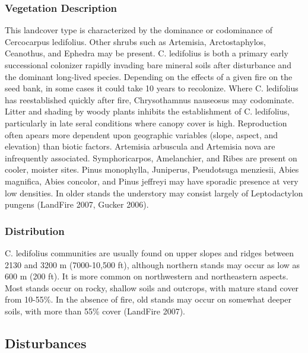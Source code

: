 \subsubsection{Vegetation Description}
This landcover type is characterized by the dominance or codominance of Cercocarpus ledifolius. Other shrubs such as Artemisia, Arctostaphylos, Ceanothus, and Ephedra may be present. C. ledifolius is both a primary early successional colonizer rapidly invading bare mineral soils after disturbance and the dominant long-lived species. Depending on the effects of a given fire on the seed bank, in some cases it could take 10 years to recolonize. Where C. ledifolius has reestablished quickly after fire, Chrysothamnus nauseosus may codominate. Litter and shading by woody plants inhibits the establishment of C. ledifolius, particularly in late seral conditions where canopy cover is high. Reproduction often apears more dependent upon geographic variables (slope, aspect, and elevation) than biotic factors. Artemisia arbuscula and Artemisia nova are infrequently associated. Symphoricarpos, Amelanchier, and Ribes are present on cooler, moister sites. Pinus monophylla, Juniperus, Pseudotsuga menziesii, Abies magnifica, Abies concolor, and Pinus jeffreyi may have sporadic presence at very low densities. In older stands the understory may consist largely of Leptodactylon pungens (LandFire 2007, Gucker 2006).

\subsubsection{Distribution}
C. ledifolius communities are usually found on upper slopes and ridges between 2130 and 3200 m (7000-10,500 ft), although northern stands may occur as low as 600 m (200 ft). It is more common on northwestern and northeastern aspects. Most stands occur on rocky, shallow soils and outcrops, with mature stand cover from 10-55\%. In the absence of fire, old stands may occur on somewhat deeper soils, with more than 55\% cover (LandFire 2007).

\subsection{Disturbances}

